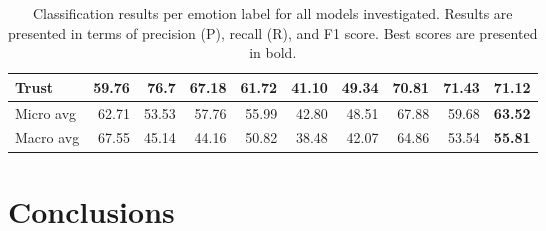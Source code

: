 \documentclass[11pt,a4paper]{article}
\begin{document}
\begin{table*}[]
\begin{tabular}{|l|rrr|rrr|rrr|}
Trust                               & 59.76                 & 76.7                  & 67.18                   & 61.72                 & 41.10                  & 49.34                   & 70.81                 & 71.43                 & {\bf 71.12}                   \\ \hline
Micro avg                           & 62.71                 & 53.53                 & 57.76                   & 55.99                 & 42.80                  & 48.51                   & 67.88                 & 59.68                 & {\bf 63.52}                   \\
Macro avg                           & 67.55                 & 45.14                 & 44.16                   & 50.82                 & 38.48                 & 42.07                   & 64.86                 & 53.54                 & {\bf 55.81}                   \\ \hline
\end{tabular}
\caption{Classification results per emotion label for all models investigated. Results are presented in terms of precision (P), recall (R), and F1 score.  Best scores are presented in bold.}
\label{table:results}
\end{table*}


\section{Conclusions}





\end{document}
